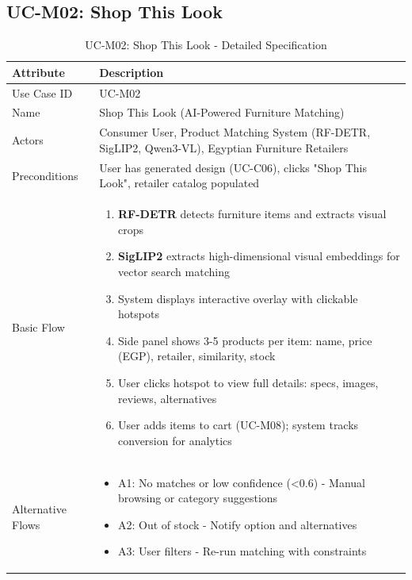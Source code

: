 \clearpage

\subsection{UC-M02: Shop This Look}
\label{sec:uc_shop_this_look}

\begin{table}[h]
\centering
\caption{UC-M02: Shop This Look - Detailed Specification}
\label{tab:uc_shop_detail}
\begin{tabular}{p{3cm}p{11cm}}
\toprule
\textbf{Attribute} & \textbf{Description} \\
\midrule
Use Case ID & UC-M02 \\
\midrule
Name & Shop This Look (AI-Powered Furniture Matching) \\
\midrule
Actors & Consumer User, Product Matching System (RF-DETR, SigLIP2, Qwen3-VL), Egyptian Furniture Retailers \\
\midrule
Preconditions & User has generated design (UC-C06), clicks "Shop This Look", retailer catalog populated \\
\midrule
Basic Flow &
\begin{enumerate}[leftmargin=*,noitemsep,topsep=0pt]
    \item \textbf{RF-DETR} detects furniture items and extracts visual crops
    \item \textbf{SigLIP2} extracts high-dimensional visual embeddings for vector search matching
    \item System displays interactive overlay with clickable hotspots
    \item Side panel shows 3-5 products per item: name, price (EGP), retailer, similarity, stock
    \item User clicks hotspot to view full details: specs, images, reviews, alternatives
    \item User adds items to cart (UC-M08); system tracks conversion for analytics
\end{enumerate} \\
\midrule
Alternative Flows &
\begin{itemize}[leftmargin=*,noitemsep,topsep=0pt]
    \item A1: No matches or low confidence (<0.6) - Manual browsing or category suggestions
    \item A2: Out of stock - Notify option and alternatives
    \item A3: User filters - Re-run matching with constraints

\end{itemize}
\end{tabular}
\end{table}

